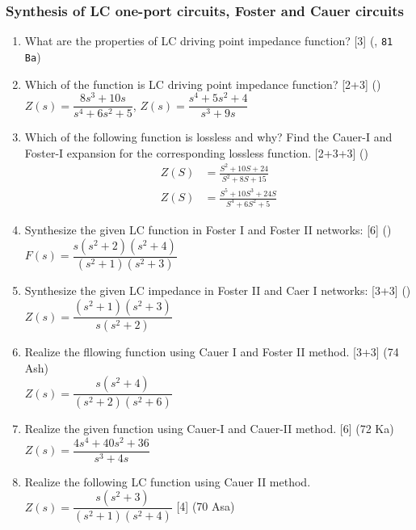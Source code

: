 \documentclass[12pt]{article}
\begin{document}
		\subsubsection{Synthesis of LC one-port circuits, Foster and Cauer circuits}
			\begin{enumerate}
				\item What are the properties of LC driving point impedance function? \hfill [3] (, \texttt{81 Ba})
				
				\item Which of the function is LC driving point impedance function? \hfill [2+3] ()\\
				$Z(s) = \dfrac{8s^3+10s}{s^4+6s^2+5}$, \hspace{1cm} $Z(s) = \dfrac{s^4+5s^2+4}{s^3+9s}$

				\item Which of the following function is lossless and why? Find the Cauer-I and Foster-I expansion for the corresponding lossless function. \hfill [2+3+3] ()
				\begin{align*}
					Z(S) &= \frac{S^2+10S+24}{S^2+8S+15}\\
					Z(S) &= \frac{S^5+10S^3+24S}{S^4+6S^2+5}
				\end{align*}

				\item Synthesize the given LC function in Foster I and Foster II networks: \hfill [6] ()\\
				$F(s) = \dfrac{s(s^2+2)(s^2+4)}{(s^2+1)(s^2+3)}$
				
				\item Synthesize the given LC impedance in Foster II and Caer I networks: \hfill [3+3] ()\\
				$Z(s) = \dfrac{(s^2+1)(s^2+3)}{s(s^2+2)}$
				
				\item Realize the fllowing function using Cauer I and Foster II method. \hfill [3+3] (74 Ash)\\
				$Z(s) = \dfrac{s(s^2+4)}{(s^2+2)(s^2+6)}$
				
				\item Realize the given function using Cauer-I and Cauer-II method. \hfill [6] (72 Ka)\\
				$Z(s) = \dfrac{4s^4+40s^2+36}{s^3+4s}$
				
				\item Realize the following LC function using Cauer II method. $Z(s) = \dfrac{s(s^2+3)}{(s^2+1)(s^2+4)}$ \hfill [4] (70 Asa)
				

\end{enumerate}
\end{document}
